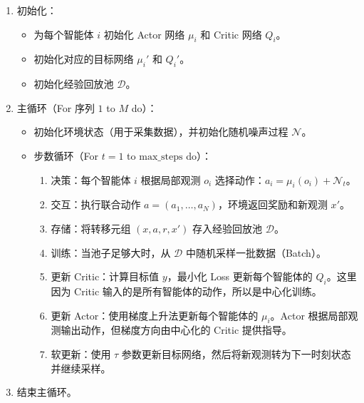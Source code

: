 \begin{enumerate}
\def\labelenumi{\arabic{enumi}.}
\tightlist
\item
{}
  初始化：

  \begin{itemize}
  \tightlist
  \item
    为每个智能体 \(i\) 初始化 Actor 网络 \(\mu_i\) 和 Critic 网络 \(Q_i\)。
  \item
    初始化对应的目标网络 \(\mu_i'\) 和 \(Q_i'\)。
  \item
    初始化经验回放池 \(\mathcal{D}\)。
  \end{itemize}
\item
{}
  主循环（For 序列 \(1\) to \(M\) do）：

  \begin{itemize}
  \tightlist
  \item
    初始化环境状态（用于采集数据），并初始化随机噪声过程 \(\mathcal{N}\)。
  \item
{}
    步数循环（For \(t=1\) to \(\mathrm{max\_steps}\) do）：

    \begin{enumerate}
    \def\labelenumii{\arabic{enumii}.}
    \tightlist
    \item
      决策：每个智能体 \(i\) 根据局部观测 \(o_i\) 选择动作：\(a_i=\mu_i(o_i)+\mathcal{N}_t\)。
    \item
      交互：执行联合动作 \(a=(a_1,\ldots,a_N)\)，环境返回奖励和新观测 \(x'\)。
    \item
      存储：将转移元组 \((x,a,r,x')\) 存入经验回放池 \(\mathcal{D}\)。
    \item
      训练：当池子足够大时，从 \(\mathcal{D}\) 中随机采样一批数据（Batch）。
    \item
      更新 Critic：计算目标值 \(y\)，最小化 Loss 更新每个智能体的 \(Q_i\)。这里因为 Critic 输入的是所有智能体的动作，所以是中心化训练。
    \item
      更新 Actor：使用梯度上升法更新每个智能体的 \(\mu_i\)。Actor 根据局部观测输出动作，但梯度方向由中心化的 Critic 提供指导。
    \item
      软更新：使用 \(\tau\) 参数更新目标网络，然后将新观测转为下一时刻状态并继续采样。
    \end{enumerate}
  \end{itemize}
\item
  结束主循环。
\end{enumerate}

